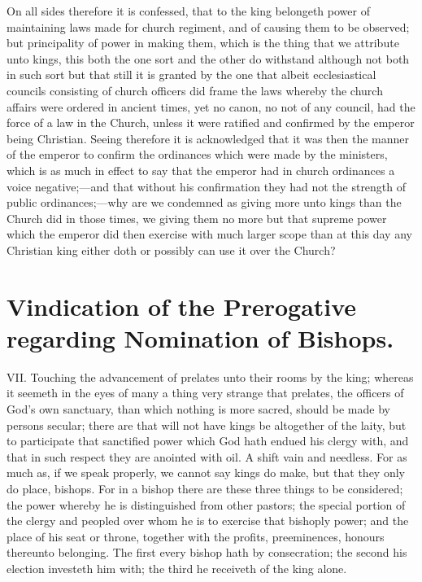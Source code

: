On all sides therefore it is confessed, that to the king belongeth power of maintaining laws made for church regiment,  and of causing them to be observed; but principality of power in making them, which is the thing that we attribute unto kings, this both the one sort and the other do withstand although not both in such sort but that still it is granted by the one that albeit ecclesiastical councils consisting of church officers did frame the laws whereby the church affairs were ordered in ancient times, yet no canon, no not of any council, had the force of a law in the Church, unless it were ratified and confirmed by the emperor being Christian. Seeing therefore it is acknowledged that it was then the manner of the emperor to confirm the ordinances which were made by the ministers, which is as much in effect to say that the emperor  had in church ordinances a voice negative;—and that without his confirmation they had not the strength of public ordinances;—why are we condemned as giving more unto kings than the Church did in those times, we giving them no more but that supreme power which the emperor did then exercise with much larger scope than at this day any Christian king either doth or possibly can use it over the Church?


\section*{Vindication of the Prerogative regarding Nomination of Bishops.}

VII. Touching the advancement of prelates unto their rooms by the king; whereas it seemeth in the eyes of many a thing very strange that prelates, the officers of God’s own sanctuary, than which nothing is more sacred, should be made by persons secular; there are that will not have kings be altogether of the laity, but to participate that sanctified power which God hath endued his clergy with, and that in such respect they are anointed with oil. A shift vain and needless. For as much as, if we speak properly, we cannot say kings do make, but that they only do place, bishops. For in a bishop there are these three things to be considered; the power whereby he is distinguished from other pastors; the special portion of the clergy and peopled over whom he is to exercise that bishoply power; and the place of his seat or throne, together with the profits, preeminences, honours thereunto belonging. The first every bishop hath by consecration; the second his election investeth him with; the third he receiveth of the king alone.

